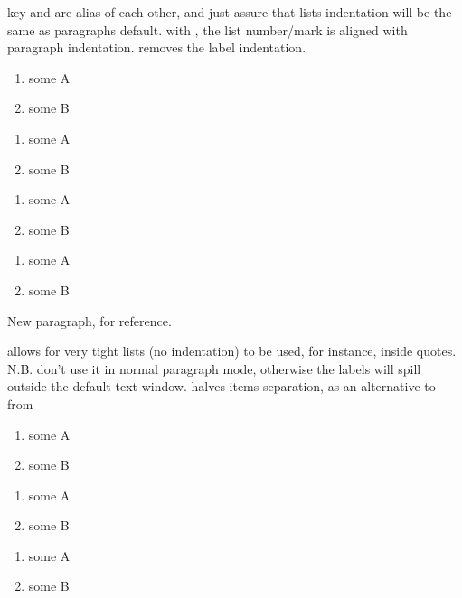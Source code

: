 \documentclass[article,nogeometry,english,tocdepth=3,secdepth=3]{ufrgscca} %
\begin{document}
\begin{describelist}{key}
	 { and  are alias of each other, and just assure that lists indentation will be the same as paragraphs default.}
	 { with , the list number/mark is aligned with paragraph indentation.}
	 {  removes the label indentation.}

	\begin{codestore}[st=enumA]
\begin{enumerate}[tcc]
	\item some A
	\item some B
\end{enumerate}
\begin{enumerate}
	\item some A
	\item some B
\end{enumerate}
\begin{enumerate}[parindent]
	\item some A
	\item some B
\end{enumerate}
\begin{enumerate}[noindent]
	\item some A
	\item some B
\end{enumerate}

New paragraph, for reference.
\end{codestore}


	 { allows for very tight lists (no indentation) to be used, for instance, inside quotes. N.B. don't use it in normal paragraph mode, otherwise the labels will spill outside the default text window.}
	 {  halves items separation, as an alternative to  from }
	\begin{codestore}[st=enumB]
	\begin{enumerate}[tcc]
		\item some A
		\item some B
	\end{enumerate}
	\begin{enumerate}
		\item some A
		\item some B
	\end{enumerate}
	\begin{enumerate}
		\item some A
		\item some B
	\end{enumerate}
\end{codestore}
\newpage
{}



\end{describelist}
\end{document}
